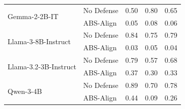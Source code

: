 \begin{table}[htbp]
\begin{tabular}{ll cc c}
        \multirow{2}{*}{Gemma-2-2B-IT}
         & No Defense           & 0.50 & 0.80  & 0.65 \\
         & ABS-Align            & 0.05 & 0.08 & 0.06 \\
        \midrule
        
        \multirow{2}{*}{Llama-3-8B-Instruct}
         & No Defense           & 0.84 & 0.75 & 0.79  \\
         & ABS-Align            & 0.03 & 0.05 & 0.04 \\
        \midrule
        
        \multirow{2}{*}{Llama-3.2-3B-Instruct}
         & No Defense           & 0.79 & 0.57 & 0.68 \\
         & ABS-Align            & 0.37 & 0.30 & 0.33 \\
        \midrule
        
        \multirow{2}{*}{Qwen-3-4B}
         & No Defense           & 0.89 & 0.70 & 0.78  \\
         & ABS-Align            & 0.44 & 0.09 & 0.26 \\
         
        \bottomrule
    \end{tabular}

    
\end{table}

